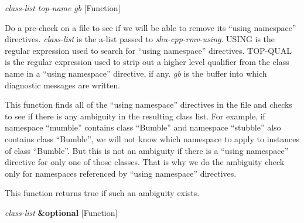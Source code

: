 \vspace{1em}
\noindent
{}
\usebox{\funcname}\emph{class-list} \emph{top-name} \emph{gb}
 \hfill [Function]

\begin{doc-string}
Do a pre-check on a file to see if we will be able to remove its ``using
namespace'' directives.  \emph{class-list} is the a-list passed to \emph{shu-cpp-rmv-using}.
USING is the regular expression used to search for ``using namespace''
directives.  TOP-QUAL is the regular expression used to strip out a higher level
qualifier from the class name in a ``using namespace'' directive, if any.  \emph{gb} is
the buffer into which diagnostic messages are written.

This function finds all of the ``using namespace'' directives in the file and
checks to see if there is any ambiguity in the resulting class list.  For
example, if namespace ``mumble'' contains class ``Bumble'' and namespace
``stubble'' also contains class ``Bumble'', we will not know which namespace to
apply to instances of class ``Bumble''.  But this is not an ambiguity if there
is a ``using namespace'' directive for only one of those classes.  That is why
we do the ambiguity check only for namespaces referenced by ``using namespace''
directives.

This function returns true if such an ambiguity exists.
\end{doc-string}

\vspace{1em}
\noindent
{}
\usebox{\funcname}\emph{class-list} \textbf{\&optional}
 \hfill [Function]
\hspace*{\wd\funcname}

